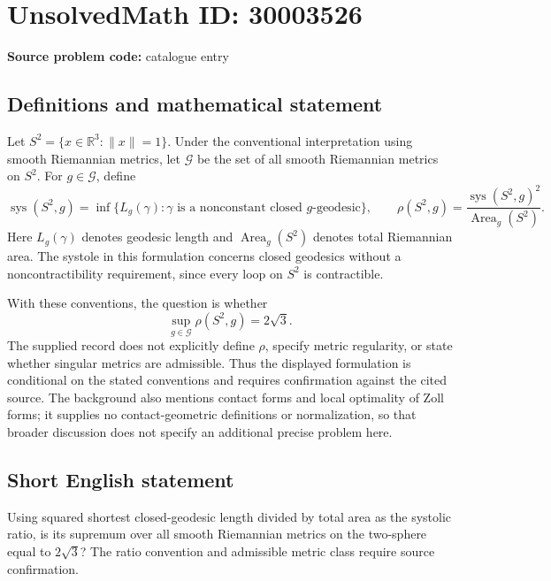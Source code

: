 \documentclass[11pt]{article}
\newcommand{\R}{\mathbb{R}}
\begin{document}
\section*{UnsolvedMath ID: 30003526}
\textbf{Source problem code:} catalogue entry
\subsection{Definitions and mathematical statement}
Let \(S^2=\{x\in\R^3:\|x\|=1\}\). Under the conventional interpretation using smooth Riemannian metrics, let \(\mathcal G\) be the set of all smooth Riemannian metrics on \(S^2\). For \(g\in\mathcal G\), define
\[
\operatorname{sys}(S^2,g)=\inf\{L_g(\gamma):\gamma\text{ is a nonconstant closed }g\text{-geodesic}\},
\qquad
\rho(S^2,g)=\frac{\operatorname{sys}(S^2,g)^2}{\operatorname{Area}_g(S^2)}.
\]
Here \(L_g(\gamma)\) denotes geodesic length and \(\operatorname{Area}_g(S^2)\) denotes total Riemannian area. The systole in this formulation concerns closed geodesics without a noncontractibility requirement, since every loop on \(S^2\) is contractible.

With these conventions, the question is whether
\[
\sup_{g\in\mathcal G}\rho(S^2,g)=2\sqrt{3}.
\]
The supplied record does not explicitly define \(\rho\), specify metric regularity, or state whether singular metrics are admissible. Thus the displayed formulation is conditional on the stated conventions and requires confirmation against the cited source. The background also mentions contact forms and local optimality of Zoll forms; it supplies no contact-geometric definitions or normalization, so that broader discussion does not specify an additional precise problem here.
\subsection{Short English statement}
Using squared shortest closed-geodesic length divided by total area as the systolic ratio, is its supremum over all smooth Riemannian metrics on the two-sphere equal to \(2\sqrt{3}\)? The ratio convention and admissible metric class require source confirmation.
\end{document}
